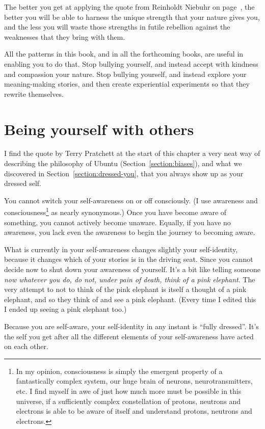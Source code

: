 The better you get at applying the quote from Reinholdt Niebuhr on page~\pageref{quote:niebuhr}, the better you will be able to harness the unique strength that your nature gives you, and the less you will waste those strengths in futile rebellion against the weaknesses that they bring with them.


All the patterns in this book, and in all the forthcoming books, are useful in enabling you to do that. Stop bullying yourself, and instead accept with kindness and compassion your nature. Stop bullying yourself, and instead explore your meaning\hyp{}making stories, and then create experiential experiments so that they rewrite themselves.
\section{Being yourself with others}
\label{section:dressed}


I find the quote by Terry Pratchett at the start of this chapter a very neat way of describing the philosophy of Ubuntu (Section~\ref{section:biases}), and what we discovered in Section~\ref{section:dressed-you}, that you always show up as your dressed self.


You cannot switch your self-awareness on or off consciously. (I use awareness and consciousness\footnote{In my opinion, consciousness is simply the emergent property of a fantastically complex system, our huge brain of neurons, neurotransmitters, etc. I find myself in awe of just how much more must be possible in this universe, if a sufficiently complex constellation of protons, neutrons and electrons is able to be aware of itself and understand protons, neutrons and electrons.} as nearly synonymous.) Once you have become aware of something, you cannot actively become unaware. Equally, if you have no awareness, you lack even the awareness to begin the journey to becoming aware.


What is currently in your self-awareness changes slightly your self-identity, because it changes which of your stories is in the driving seat. Since you cannot decide now to shut down your awareness of yourself. It’s a bit like telling someone 
\emph{now whatever you do, do not, under pain of death, think of a pink elephant}. The very attempt to not to think of the pink elephant is itself a thought of a pink elephant, and so they think of and see a pink elephant. (Every time I edited this I ended up seeing a pink elephant too.)


Because you are self-aware, your self-identity in any instant is “fully dressed”. It's the self you get after all the different elements of your self-awareness have acted on each other. 


